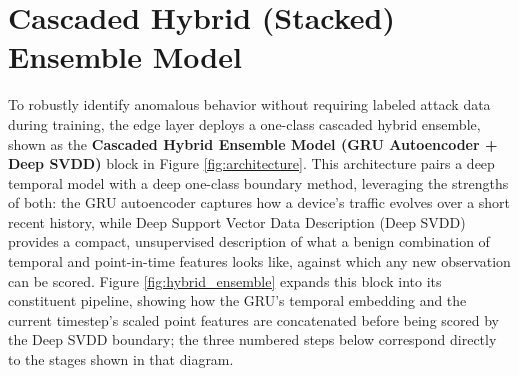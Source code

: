 \section{Cascaded Hybrid (Stacked) Ensemble Model}\label{sec:hybrid_ensemble}

To robustly identify anomalous behavior without requiring labeled attack data during training, the edge layer deploys a one-class cascaded hybrid ensemble, shown as the \textbf{Cascaded Hybrid Ensemble Model (GRU Autoencoder + Deep SVDD)} block in Figure \ref{fig:architecture}. This architecture pairs a deep temporal model with a deep one-class boundary method, leveraging the strengths of both: the GRU autoencoder captures how a device's traffic evolves over a short recent history, while Deep Support Vector Data Description (Deep SVDD) provides a compact, unsupervised description of what a benign combination of temporal and point-in-time features looks like, against which any new observation can be scored. Figure \ref{fig:hybrid_ensemble} expands this block into its constituent pipeline, showing how the GRU's temporal embedding and the current timestep's scaled point features are concatenated before being scored by the Deep SVDD boundary; the three numbered steps below correspond directly to the stages shown in that diagram.

